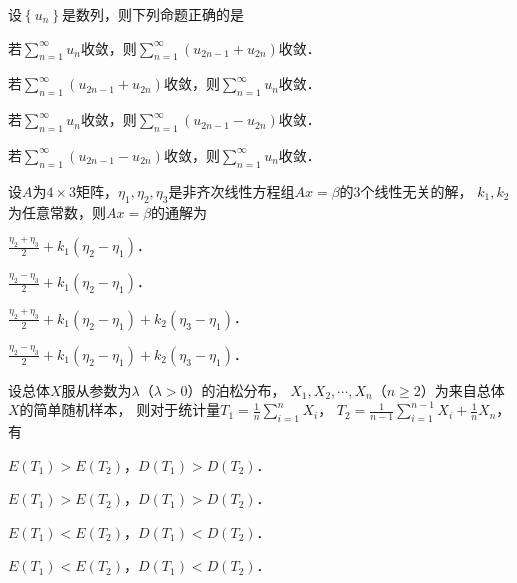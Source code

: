 \documentclass[plain,noanswer,medmath]{../../template/jnuexam}
\begin{document}










\begin{problem}
设$\left\{u_n \right\}$是数列，则下列命题正确的是\pickout{}
\begin{abcd}
\item 若$\sum_{n = 1}^{\infty}u_n$收敛，则$\sum_{n = 1}^{\infty}(u_{2n - 1} + u_{2n})$收敛．
\item 若$\sum_{n = 1}^{\infty}(u_{2n - 1} + u_{2n})$收敛，则$\sum_{n = 1}^{\infty}u_n$收敛．
\item 若$\sum_{n = 1}^{\infty}u_n$收敛，则$\sum_{n = 1}^{\infty}(u_{2n - 1} - u_{2n})$收敛．
\item 若$\sum_{n = 1}^{\infty}(u_{2n - 1} - u_{2n})$收敛，则$\sum_{n = 1}^{\infty}u_n$收敛．
\end{abcd}
\end{problem}






\begin{problem}
设$A$为$4 \times 3$矩阵，$\eta_1,\eta_2,\eta_3$是非齐次线性方程组$Ax = \beta$的$3$个线性无关的解，
$k_1,k_2$为任意常数，则$Ax = \beta$的通解为\pickout{}
\begin{abcd}
\item $\frac{\eta_2 + \eta_3}{2} + k_1(\eta_2 - \eta_1)$．
\item $\frac{\eta_2 - \eta_3}{2} + k_1(\eta_2 - \eta_1)$．
\item $\frac{\eta_2 + \eta_3}{2} + k_1(\eta_2 - \eta_1) + k_2(\eta_3 - \eta_1)$．
\item $\frac{\eta_2 - \eta_3}{2} + k_1(\eta_2 - \eta_1) + k_2(\eta_3 - \eta_1)$．
\end{abcd}
\end{problem}




\begin{problem}
设总体$X$服从参数为$\lambda$（$\lambda > 0$）的泊松分布，
$X_1,X_2, \cdots ,X_n$（$n \ge 2$）为来自总体$X$的简单随机样本，
则对于统计量$T_1 = \frac{1}{n}\sum_{i = 1}^n X_i$，
$T_2 = \frac{1}{n - 1}\sum_{i = 1}^{n - 1} X_i + \frac{1}{n} X_n$，有\pickout{}
\begin{abcd}
\item $E(T_1) > E(T_2)$，$D(T_1) > D(T_2)$．
\item $E(T_1) > E(T_2)$，$D(T_1) > D(T_2)$．
\item $E(T_1) < E(T_2)$，$D(T_1) < D(T_2)$．
\item $E(T_1) < E(T_2)$，$D(T_1) < D(T_2)$．
\end{abcd}
\end{problem}
\end{document}
